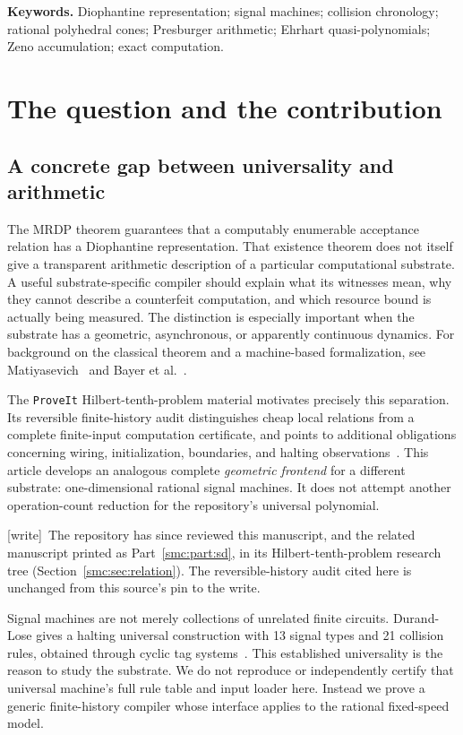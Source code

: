 \documentclass[11pt,letterpaper]{article}
\numberwithin{equation}{section}
\theoremstyle{definition}
\theoremstyle{remark}
\newcommand{\wtag}{\textup{[write]}}
\begin{document}
\noindent\textbf{Keywords.} Diophantine representation; signal machines;
collision chronology; rational polyhedral cones; Presburger arithmetic;
Ehrhart quasi-polynomials; Zeno accumulation; exact computation.

\section{The question and the contribution}
\label{smc:cg:sec:intro}

\subsection{A concrete gap between universality and arithmetic}

The MRDP theorem guarantees that a computably enumerable acceptance relation
has a Diophantine representation. That existence theorem does not itself give
a transparent arithmetic description of a particular computational substrate.
A useful substrate-specific compiler should explain what its witnesses mean,
why they cannot describe a counterfeit computation, and which resource bound
is actually being measured. The distinction is especially important when the
substrate has a geometric, asynchronous, or apparently continuous dynamics.
For background on the classical theorem and a machine-based formalization,
see Matiyasevich~\cite{matiyasevich} and Bayer et al.~\cite{afp}.

The \texttt{ProveIt} Hilbert-tenth-problem material motivates precisely this
separation. Its reversible finite-history audit distinguishes cheap local
relations from a complete finite-input computation certificate, and points
to additional obligations concerning wiring, initialization, boundaries,
and halting observations~\cite{repo,reversible}. This article develops an
analogous complete \emph{geometric frontend} for a different substrate:
one-dimensional rational signal machines. It does not attempt another
operation-count reduction for the repository's universal polynomial.

\wtag\ The repository has since reviewed this manuscript, and the related manuscript printed as Part~\ref{smc:part:sd}, in its Hilbert-tenth-problem research tree (Section~\ref{smc:sec:relation}). The reversible-history audit cited here is unchanged from this source's pin to the write.


Signal machines are not merely collections of unrelated finite circuits.
Durand-Lose gives a halting universal construction with 13 signal types and
21 collision rules, obtained through cyclic tag systems~\cite{durandlose}.
This established universality is the reason to study the substrate. We do
not reproduce or independently certify that universal machine's full rule
table and input loader here. Instead we prove a generic finite-history
compiler whose interface applies to the rational fixed-speed model.
\end{document}
